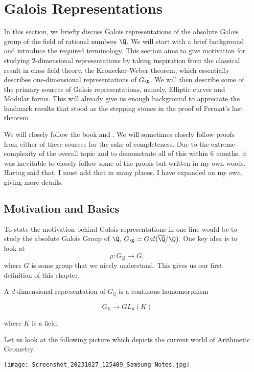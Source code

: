 \section{Galois Representations}
In this section, we briefly discuss Galois representations of the absolute Galois group of the field of rational numbers $\Q$. We will start with a brief background and introduce the required terminology. This section aims to give motivation for studying 2-dimensional representations by taking inspiration from the classical result in class field theory, the Kronecker-Weber theorem, which essentially describes one-dimensional representations of $G_\Q$. We will then describe some of the primary sources of Galois representations, namely, Elliptic curves and Modular forms. This will already give us enough background to appreciate the landmark results that stood as the stepping stones in the proof of Fermat's last theorem. 

We will closely follow the book \cite{diamond2005first} and \cite{darmon1995fermat}. We will sometimes closely follow proofs from either of these sources for the sake of completeness. Due to the extreme complexity of the overall topic and to demonstrate all of this within 6 months, it was inevitable to closely follow some of the proofs but written in my own words. Having said that, I must add that in many places, I have expanded on my own, giving more details.



\subsection{Motivation and Basics}

To state the motivation behind Galois representations in one line would be to study the absolute Galois Group of $\Q$, $G_\Q=Gal(\overline{\Q}/\Q)$. One key idea is to look at $$\rho: G_Q \longrightarrow G,$$ where $G$ is some group that we nicely understand. This gives us our first definition of this chapter. 

\begin{definition}
A $d$-dimensional representation of $G_{\mathbb{Q}}$ is a continous homomorphism

$$
G_{\mathbb{Q}} \longrightarrow G L_{d}(K)
$$

where $K$ is a field.  


Let us look at the following picture which depicts the current world of Arithmetic Geometry. 

\end{definition}
  \begin{center}
      \texttt{[image: Screenshot\_20231027\_125409\_Samsung Notes.jpg]}
  \end{center} 

